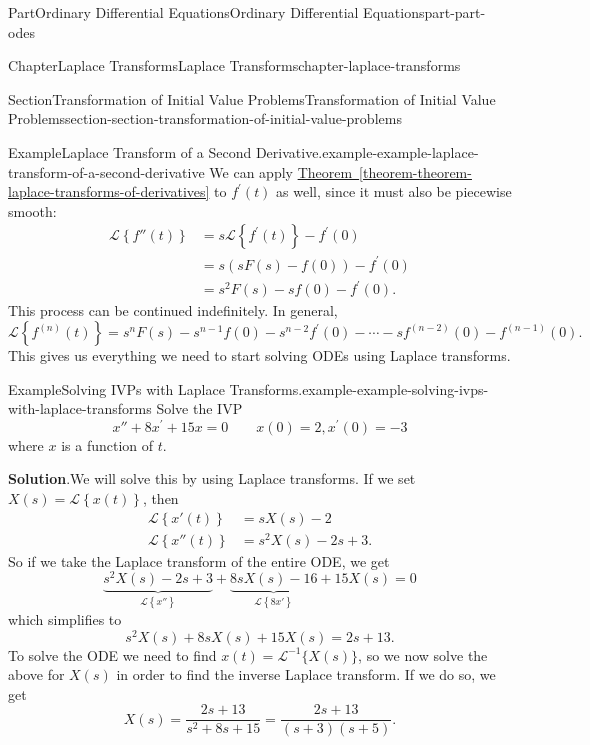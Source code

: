 \documentclass[twoside,10pt,]{book}
\newcommand{\blocktitlefont}{\relax}
\newcommand{\xreffont}{\relax}
\numberwithin{equation}{part}
\newcommand{\Laplace}[1]{\mathcal{L}\set{#1}}
\newcommand{\set}[1]{\left\{ #1 \right\}}
\newcommand{\qq}[1]{\quad\text{#1}\quad}
\begin{document}
\begin{partptx}{Part}{Ordinary Differential Equations}{}{Ordinary Differential Equations}{}{}{part-part-odes}
\begin{chapterptx}{Chapter}{Laplace Transforms}{}{Laplace Transforms}{}{}{chapter-laplace-transforms}
\begin{sectionptx}{Section}{Transformation of Initial Value Problems}{}{Transformation of Initial Value Problems}{}{}{section-section-transformation-of-initial-value-problems}
\begin{example}{Example}{Laplace Transform of a Second Derivative.}{example-example-laplace-transform-of-a-second-derivative}
We can apply \hyperref[theorem-theorem-laplace-transforms-of-derivatives]{Theorem~{\xreffont\ref{theorem-theorem-laplace-transforms-of-derivatives}}} to \(f^\prime(t)\) as well, since it must also be piecewise smooth:%
\begin{align*}
\Laplace{f''(t)} &= s\Laplace{f^\prime(t)} - f^\prime(0)\\
&= s(sF(s)-f(0)) - f^\prime(0)\\
&= s^{2}F(s) - sf(0) - f^\prime(0)\text{.}
\end{align*}
This process can be continued indefinitely. In general,%
\begin{equation*}
\Laplace{f^{(n)}(t)} = s^{n}F(s) - s^{n-1}f(0) - s^{n-2}f^\prime(0) - \cdots -sf^{(n-2)}(0) - f^{(n-1)}(0).
\end{equation*}
This gives us everything we need to start solving ODEs using Laplace transforms.%
\end{example}
\begin{example}{Example}{Solving IVPs with Laplace Transforms.}{example-example-solving-ivps-with-laplace-transforms}%
Solve the IVP%
\begin{equation*}
x''+8x^\prime+15x = 0 \qq{} x(0) = 2, x^\prime(0) = -3
\end{equation*}
where \(x\) is a function of \(t\).%
\par\smallskip%
\noindent\textbf{\blocktitlefont Solution}.\hypertarget{solution-example-solving-ivps-with-laplace-transforms-c}{}\quad{}We will solve this by using Laplace transforms. If we set \(X(s) = \Laplace{x(t)}\), then%
\begin{align*}
\Laplace{x'(t)} &= sX(s) - 2\\
\Laplace{x''(t)} &= s^{2}X(s) - 2s +3\text{.}
\end{align*}
So if we take the Laplace transform of the entire ODE, we get%
\begin{equation*}
\underbrace{s^{2}X(s) - 2s + 3}_{\Laplace{x''}} + \underbrace{8sX(s) - 16}_{\Laplace{8x'}} + 15X(s) = 0
\end{equation*}
which simplifies to%
\begin{equation*}
s^{2}X(s)+8sX(s)+15X(s) = 2s+13.
\end{equation*}
To solve the ODE we need to find \(x(t) = \mathcal{L}^{-1}\{X(s)\}\), so we now solve the above for \(X(s)\) in order to find the inverse Laplace transform. If we do so, we get%
\begin{equation*}
X(s) = \frac{2s+13}{s^{2}+8s+15} = \frac{2s+13}{(s+3)(s+5)}.
\end{equation*}

\end{example}
\end{sectionptx}
\end{chapterptx}
\end{partptx}
\end{document}
